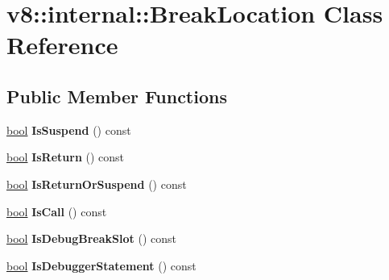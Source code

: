 \hypertarget{classv8_1_1internal_1_1BreakLocation}{}\section{v8\+:\+:internal\+:\+:Break\+Location Class Reference}
\label{classv8_1_1internal_1_1BreakLocation}
\subsection*{Public Member Functions}
\begin{DoxyCompactItemize}
\item 
\mbox{\label{classv8_1_1internal_1_1BreakLocation_adba7e58d5ac51a0c924c69624d034436}} 
\mbox{\hyperlink{classbool}{bool}} {\bfseries Is\+Suspend} () const
\item 
\mbox{\label{classv8_1_1internal_1_1BreakLocation_aa2256137fb16a80137c8fc70b6b4047b}} 
\mbox{\hyperlink{classbool}{bool}} {\bfseries Is\+Return} () const
\item 
\mbox{\label{classv8_1_1internal_1_1BreakLocation_ae77f17c5b92edc556014552cbaa7596e}} 
\mbox{\hyperlink{classbool}{bool}} {\bfseries Is\+Return\+Or\+Suspend} () const
\item 
\mbox{\label{classv8_1_1internal_1_1BreakLocation_a659abff1a914bfe1fd0ff46ad1dbf08a}} 
\mbox{\hyperlink{classbool}{bool}} {\bfseries Is\+Call} () const
\item 
\mbox{\label{classv8_1_1internal_1_1BreakLocation_a66a3a2889a047e4196510ffda3f29902}} 
\mbox{\hyperlink{classbool}{bool}} {\bfseries Is\+Debug\+Break\+Slot} () const
\item 
\mbox{\label{classv8_1_1internal_1_1BreakLocation_af8ffd88487b0a6f6d06a21cb230d69ed}} 
\mbox{\hyperlink{classbool}{bool}} {\bfseries Is\+Debugger\+Statement} () const
\item 
\mbox{\label{classv8_1_1internal_1_1BreakLocation_ab02bdcf0f030991efd88f20d33b294d4}} 

\end{DoxyCompactItemize}

